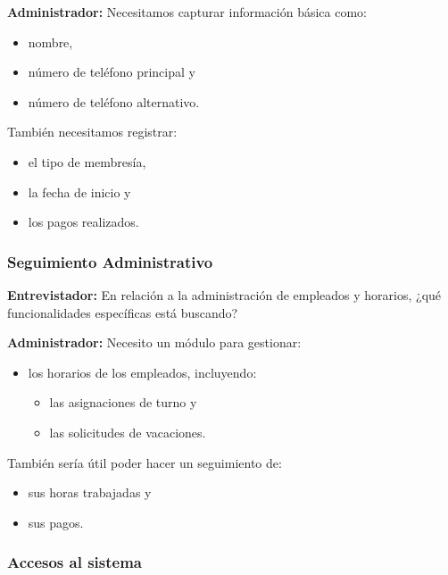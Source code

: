 \documentclass[spanish,12pt]{article}
\providecommand{\tightlist}{\setlength{\itemsep}{0pt}\setlength{\parskip}{0pt}}
\begin{document}
\textbf{Administrador:} Necesitamos capturar información básica como:

\begin{itemize}
\tightlist
\item
  nombre,
\item
  número de teléfono principal y
\item
  número de teléfono alternativo.
\end{itemize}

También necesitamos registrar:

\begin{itemize}
\tightlist
\item
  el tipo de membresía,
\item
  la fecha de inicio y
\item
  los pagos realizados.
\end{itemize}

\subsubsection{Seguimiento
Administrativo}\label{seguimiento-administrativo}

\textbf{Entrevistador:} En relación a la administración de empleados y
horarios, ¿qué funcionalidades específicas está buscando?

\textbf{Administrador:} Necesito un módulo para gestionar:

\begin{itemize}
\tightlist
\item
  los horarios de los empleados, incluyendo:

  \begin{itemize}
  \tightlist
  \item
    las asignaciones de turno y
  \item
    las solicitudes de vacaciones.
  \end{itemize}
\end{itemize}

También sería útil poder hacer un seguimiento de:

\begin{itemize}
\tightlist
\item
  sus horas trabajadas y
\item
  sus pagos.
\end{itemize}

\subsubsection{Accesos al sistema}\label{accesos-al-sistema}
\end{document}
